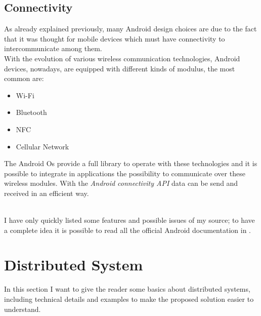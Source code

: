 \subsection{Connectivity}\label{connectivity}
\par
As already explained previously, many Android design choices are due to the fact that it was thought for mobile devices which must have connectivity to intercommunicate among them.\\
With the evolution of various wireless communication technologies, Android devices, nowadays, are equipped with different kinds of modulus, the most common are:
\begin{itemize}
	\item Wi-Fi
	\item Bluetooth
	\item NFC
	\item Cellular Network
\end{itemize}
The Android Os provide a full library to operate with these technologies and it is possible to integrate in applications the possibility to communicate over these wireless modules.
With the \textit{Android connectivity API} data can be send and received in an efficient way.\\\\
\par
I have only quickly listed some features and possible issues of my source; to have a complete idea it is possible to read all the official Android documentation in \cite{devandroifundamentals}.
 
\section{Distributed System} \label{distsys}
In this section I want to give the reader some basics about distributed systems, including technical details and examples to make the proposed solution easier to understand.
